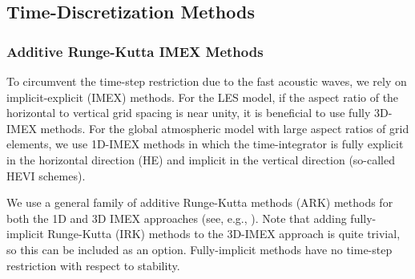 \documentclass{article}
\begin{document}
\subsection{Time-Discretization Methods}\label{s:timestepping}

\subsubsection{Additive Runge-Kutta IMEX Methods}

To circumvent the time-step restriction due to the fast acoustic waves, we rely on implicit-explicit (IMEX) methods. For the LES model, if the aspect ratio of the horizontal to vertical grid spacing is near unity, it is beneficial to use fully 3D-IMEX methods.  For the global atmospheric model with large aspect ratios of grid elements, we use 1D-IMEX methods in which the time-integrator is fully explicit in the horizontal direction (HE) and implicit in the vertical direction (so-called HEVI schemes).

We use a general family of additive Runge-Kutta methods (ARK) methods for both the 1D and 3D IMEX approaches (see, e.g., \citet{giraldo:2013}). Note that adding fully-implicit Runge-Kutta (IRK) methods to the 3D-IMEX approach is quite trivial, so this can be included as an option. Fully-implicit methods have no time-step restriction with respect to stability.
\end{document}
